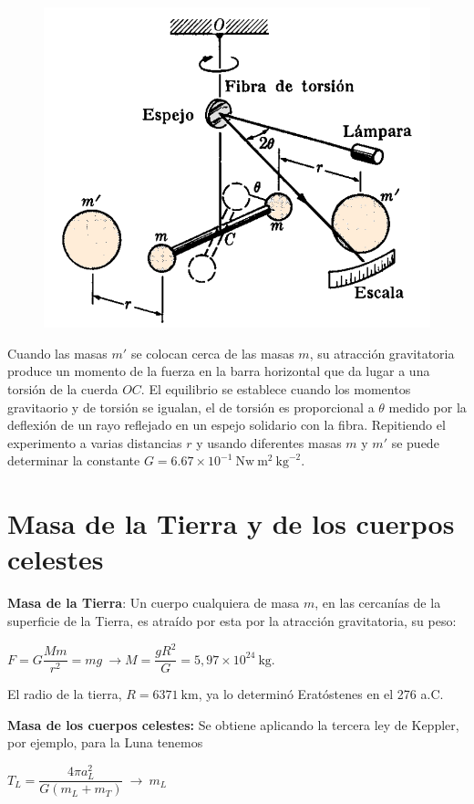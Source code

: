 \begin{figure}[H]
	\centering
	\includegraphics[width=.75\textwidth]{imagenes/imagenes14/T14IM12.png}
\end{figure}

Cuando las masas $m'$ se colocan cerca de las masas $m$, su atracción gravitatoria produce un momento de la fuerza en la barra horizontal que da lugar a una torsión de la cuerda $OC$. El equilibrio se establece cuando los momentos gravitaorio y de torsión se igualan, el de torsión es proporcional a $\theta$ medido por la deflexión de un rayo reflejado en un espejo solidario con la fibra. Repitiendo el experimento a varias distancias $r$ y usando diferentes masas $m$ y $m'$ se puede determinar la constante $G=6.67 \times 10^{-1}\ \mathrm{Nw} \ \mathrm{m}^2 \ \mathrm{kg}^{-2}$.


\section{Masa de la Tierra y de los cuerpos celestes}

\textbf{Masa de la Tierra}: Un cuerpo cualquiera de masa $m$, en las cercanías de la superficie de la Tierra, es atraído por esta por la atracción gravitatoria, su peso:

$F=G\dfrac {Mm}{r^2}=mg \ \to M=\dfrac{g R^2}{G} = 5,97\times 10^{24}\ \mathrm{kg}$.

El radio de la tierra, $R=6371\ \mathrm{km}$, ya lo determinó Eratóstenes en el 276 a.C.


\textbf{Masa de los cuerpos celestes:} Se obtiene aplicando la tercera ley de Keppler, por ejemplo, para la Luna tenemos

$T_L=\dfrac {4 \pi a_L^2}{G(m_L+m_T)}\  \to \ m_L$

